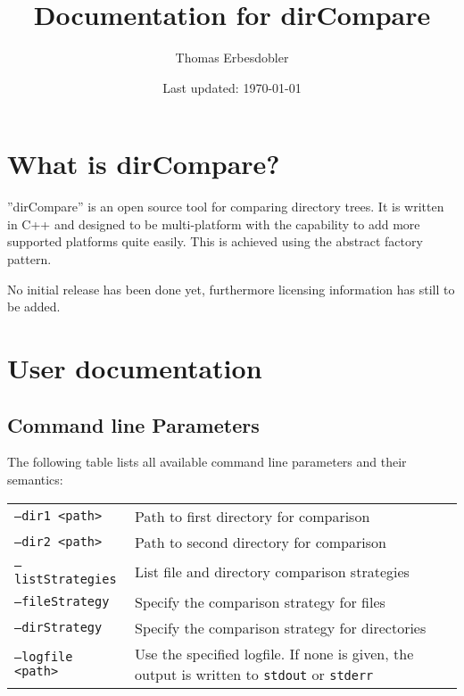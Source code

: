 \documentclass[a4paper]{article}
\title{Documentation for dirCompare}
\author{Thomas Erbesdobler}
\date{Last updated: \today}
\begin{document}
	\maketitle
	\tableofcontents
	
	\section{What is dirCompare?}
	\label{sec:what_is_dircompare}
	
	''dirCompare'' is an open source tool for comparing directory trees. It is written in C++ and designed to be multi-platform with the capability to add more supported platforms quite easily. This is achieved using the abstract factory pattern.
	
	No initial release has been done yet, furthermore licensing information has still to be added.
	
	\section{User documentation}
	\label{sec:user_documentation}
	
	\subsection{Command line Parameters}
	\label{subsec:command_line_parameters}
	
	The following table lists all available command line parameters and their semantics:
	
	\noindent
	\begin{tabularx}{\linewidth}{l|X}
		\texttt{--dir1 \textless path\textgreater} & Path to first directory for comparison \\
		\texttt{--dir2 \textless path\textgreater} & Path to second directory for comparison \\
		\texttt{--listStrategies} & List file and directory comparison strategies \\
		\texttt{--fileStrategy} & Specify the comparison strategy for files \\
		\texttt{--dirStrategy} & Specify the comparison strategy for directories \\
		\texttt{--logfile \textless path\textgreater} & Use the specified logfile. If none is given, the output is written to \texttt{stdout} or \texttt{stderr} \\
	\end{tabularx}
	
\end{document}

